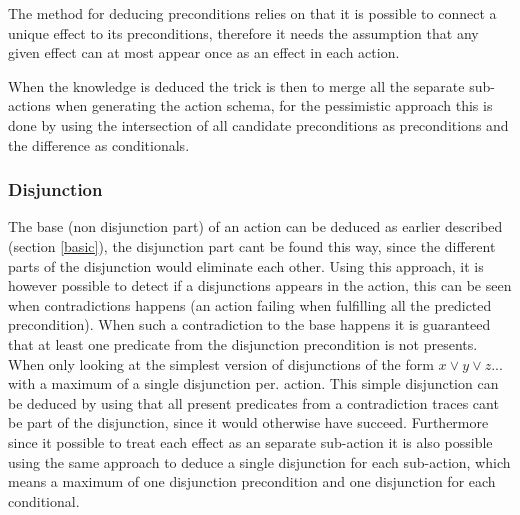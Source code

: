 	The method for deducing preconditions relies on that it is possible to connect a unique effect to its preconditions, therefore it needs the assumption that any given effect can at most appear once as an effect in each action.
	
	When the knowledge is deduced the trick is then to merge all the separate sub-actions when generating the action schema, for the pessimistic approach this is done by using the intersection of all candidate preconditions as preconditions and the difference as conditionals.
	
	
\subsubsection{Disjunction}
	The base (non disjunction part) of an action can be deduced as earlier described (section \ref{basic}), the disjunction part cant be found this way, since the different parts of the disjunction would eliminate each other. Using this approach, it is however possible to detect if a disjunctions appears in the action, this can be seen when contradictions happens (an action failing when fulfilling all the predicted precondition). When such a contradiction to the base happens it is guaranteed that at least one predicate from the disjunction precondition is not presents. When only looking at the simplest version of disjunctions of the form $ x \lor y \lor z...$ with a maximum of a single disjunction per. action. This simple disjunction can be deduced by using that all present predicates from a contradiction traces cant be part of the disjunction, since it would otherwise have succeed. Furthermore since it possible to treat each effect as an separate sub-action it is also possible using the same approach to deduce a single disjunction for each sub-action, which means a maximum of one disjunction precondition and one disjunction for each conditional. 
	
